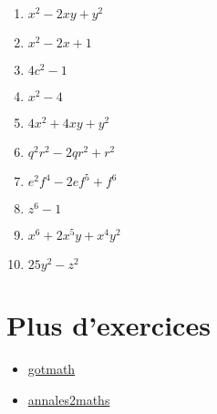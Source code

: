 \documentclass[a4paper,11pt]{article}
\begin{document}
\begin{solution}
\begin{enumerate}
\item $x^2-2xy+y^2$
\item $x^2-2x+1$
\item $4c^2-1$
\item $x^2-4$
\item $4x^2+4xy+y^2$
\item $q^2r^2-2qr^2+r^2$
\item $e^2f^4-2ef^5+f^6$
\item $z^6-1$
\item $x^6+2x^5y+x^4y^2$
\item $25y^2-z^2$
\end{enumerate}
\end{solution}

\section{Plus d'exercices}
\begin{itemize}
\item \href{https://www.gomaths.ch/cl_prod_bin_print.php}{gotmath}
\item \href{https://www.annales2maths.com/2nd-exercices-corriges-identites-remarquables-developpement/}{annales2maths}
\end{itemize}
\end{document}

